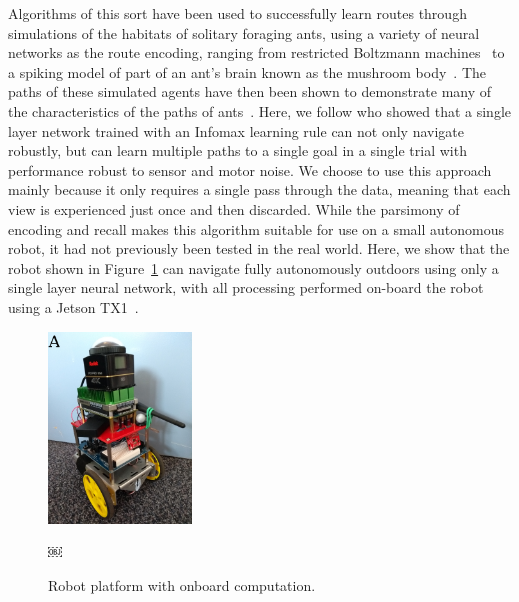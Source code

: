 \documentclass[letterpaper]{article}
\begin{document}
Algorithms of this sort have been used to successfully learn routes through simulations of the habitats of solitary foraging ants, using a variety of neural networks as the route encoding, ranging from restricted Boltzmann machines~\citep{Baddeley2011models} to a spiking model of part of an ant’s brain known as the mushroom body~\citep{Ardin2016}.
The paths of these simulated agents have then been shown to demonstrate many of the characteristics of the paths of ants~\citep{Wystrach2013}.
Here, we follow \citet{Baddeley2012} who showed that a single layer network trained with an Infomax learning rule can not only navigate robustly, but can learn multiple paths to a single goal in a single trial with performance robust to sensor and motor noise.
We choose to use this approach mainly because it only requires a single pass through the data, meaning that each view is experienced just once and then discarded.
While the parsimony of encoding and recall makes this algorithm suitable for use on a small autonomous robot, it had not previously been tested in the real world.
Here, we show that the robot shown in Figure~\ref{fig:robot} can navigate fully autonomously outdoors using only a single layer neural network, with all processing performed on-board the robot using a Jetson TX1~\citep{NVIDIACorporation2016}.

\begin{figure}[t]
    \centering
    \includegraphics[height=2in]{figures/robot.jpg}
    \caption{Robot platform with onboard computation.}￼
    \label{fig:robot}
\end{figure}
\end{document}
